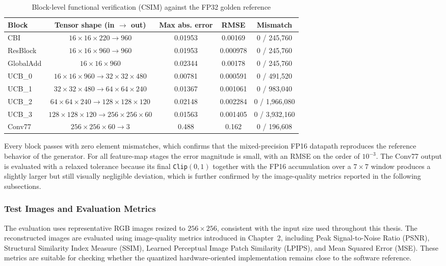 \begin{table}[H]
\centering
\caption{Block-level functional verification (CSIM) against the FP32 golden reference}
\label{tab:csim_verification}
\small
\renewcommand{\arraystretch}{1.2}
\begin{tabular}{|l|c|c|c|c|}
\hline
\textbf{Block} & \textbf{Tensor shape (in $\rightarrow$ out)} & \textbf{Max abs. error} & \textbf{RMSE} & \textbf{Mismatch} \\
\hline
CBI & $16\times16\times220 \rightarrow 960$ & 0.01953 & 0.00169 & 0 / 245,760 \\
\hline
ResBlock & $16\times16\times960 \rightarrow 960$ & 0.01953 & 0.000978 & 0 / 245,760 \\
\hline
GlobalAdd & $16\times16\times960$ & 0.02344 & 0.00178 & 0 / 245,760 \\
\hline
UCB\_0 & $16\times16\times960 \rightarrow 32\times32\times480$ & 0.00781 & 0.000591 & 0 / 491,520 \\
\hline
UCB\_1 & $32\times32\times480 \rightarrow 64\times64\times240$ & 0.01367 & 0.001061 & 0 / 983,040 \\
\hline
UCB\_2 & $64\times64\times240 \rightarrow 128\times128\times120$ & 0.02148 & 0.002284 & 0 / 1,966,080 \\
\hline
UCB\_3 & $128\times128\times120 \rightarrow 256\times256\times60$ & 0.01563 & 0.001405 & 0 / 3,932,160 \\
\hline
Conv77 & $256\times256\times60 \rightarrow 3$ & 0.488 & 0.162 & 0 / 196,608 \\
\hline
\end{tabular}
\end{table}

Every block passes with zero element mismatches, which confirms that the mixed-precision FP16 datapath reproduces the reference behavior of the generator. For all feature-map stages the error magnitude is small, with an RMSE on the order of $10^{-3}$. The Conv77 output is evaluated with a relaxed tolerance because its final \texttt{Clip}$(0,1)$ together with the FP16 accumulation over a $7\times7$ window produces a slightly larger but still visually negligible deviation, which is further confirmed by the image-quality metrics reported in the following subsections.

\subsubsection{Test Images and Evaluation Metrics}

The evaluation uses representative RGB images resized to $256 \times 256$, consistent with the input size used throughout this thesis. The reconstructed images are evaluated using image-quality metrics introduced in Chapter~2, including Peak Signal-to-Noise Ratio (PSNR), Structural Similarity Index Measure (SSIM), Learned Perceptual Image Patch Similarity (LPIPS), and Mean Squared Error (MSE). These metrics are suitable for checking whether the quantized hardware-oriented implementation remains close to the software reference.

